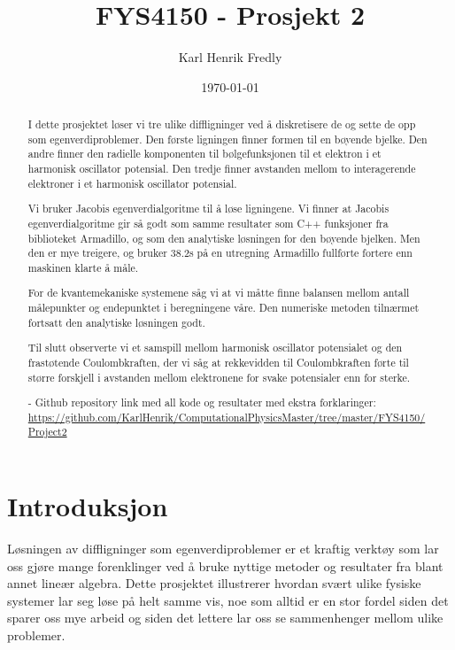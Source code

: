 \documentclass[reprint,english,notitlepage]{revtex4-1}
\begin{document}
	
\title{FYS4150 - Prosjekt 2}
\date{\today}               
\author{Karl Henrik Fredly}

\newpage
	
\begin{abstract} %
	I dette prosjektet løser vi tre ulike diffligninger ved å diskretisere de og sette de opp som egenverdiproblemer. Den første ligningen finner formen til en bøyende bjelke. Den andre finner den radielle komponenten til bølgefunksjonen til et elektron i et harmonisk oscillator potensial. Den tredje finner avstanden mellom to interagerende elektroner i et harmonisk oscillator potensial.
	
	Vi bruker Jacobis egenverdialgoritme til å løse ligningene. Vi finner at Jacobis egenverdialgoritme gir så godt som samme resultater som C++ funksjoner fra biblioteket Armadillo, og som den analytiske løsningen for den bøyende bjelken. Men den er mye treigere, og bruker 38.2s på en utregning Armadillo fullførte fortere enn maskinen klarte å måle.
	
	For de kvantemekaniske systemene såg vi at vi måtte finne balansen mellom antall målepunkter og endepunktet i beregningene våre. Den numeriske metoden tilnærmet fortsatt den analytiske løsningen godt.
	
	Til slutt observerte vi et samspill mellom harmonisk oscillator potensialet og den frastøtende Coulombkraften, der vi såg at rekkevidden til Coulombkraften førte til større forskjell i avstanden mellom elektronene for svake potensialer enn for sterke.
	
	- Github repository link med all kode og resultater med ekstra forklaringer: \href{https://github.com/KarlHenrik/ComputationalPhysicsMaster/tree/master/FYS4150/Project2}{https://github.com/KarlHenrik/ComputationalPhysicsMaster/tree/master/FYS4150/Project2}
\end{abstract}
\maketitle

\section{Introduksjon} %
	Løsningen av diffligninger som egenverdiproblemer er et kraftig verktøy som lar oss gjøre mange forenklinger ved å bruke nyttige metoder og resultater fra blant annet lineær algebra. Dette prosjektet illustrerer hvordan svært ulike fysiske systemer lar seg løse på helt samme vis, noe som alltid er en stor fordel siden det sparer oss mye arbeid og siden det lettere lar oss se sammenhenger mellom ulike problemer.
	
\end{document}
